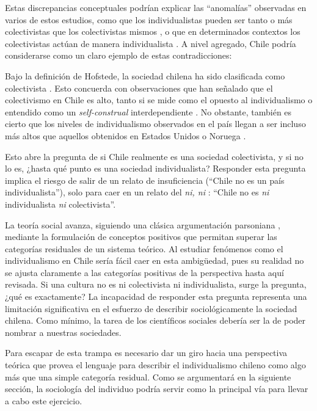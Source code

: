 \documentclass[12pt,twoside]{templates/facsothesis}
\begin{document}
Estas discrepancias conceptuales podrían explicar las ``anomalías'' observadas en varios de estos estudios, como que los individualistas pueden ser tanto o más colectivistas que los colectivistas mismos \citep{oyserman2002}, o que en determinados contextos los colectivistas actúan de manera individualista \citep{voronov2002}. A nivel agregado, Chile podría considerarse como un claro ejemplo de estas contradicciones:

Bajo la definición de Hofstede, la sociedad chilena ha sido clasificada como colectivista \citep{rojas2008}. Esto concuerda con observaciones que han señalado que el colectivismo en Chile es alto, tanto si se mide como el opuesto al individualismo \citep{oyserman2002} o entendido como un \emph{self-construal} interdependiente \citep{benavides2020}. No obstante, también es cierto que los niveles de individualismo observados en el país llegan a ser incluso más altos que aquellos obtenidos en Estados Unidos \citep{oyserman2002} o Noruega \citep{kolstad2009}.

Esto abre la pregunta de si Chile realmente es una sociedad colectivista, y si no lo es, ¿hasta qué punto es una sociedad individualista? Responder esta pregunta implica el riesgo de salir de un relato de insuficiencia (``Chile no es un país individualista''), solo para caer en un relato del \emph{ni, ni} \citep{martuccelli2010}: ``Chile no es \emph{ni} individualista \emph{ni} colectivista''.

La teoría social avanza, siguiendo una clásica argumentación parsoniana \citep{bouzanis2019}, mediante la formulación de conceptos positivos que permitan superar las categorías residuales de un sistema teórico. Al estudiar fenómenos como el individualismo en Chile sería fácil caer en esta ambigüedad, pues su realidad no se ajusta claramente a las categorías positivas de la perspectiva hasta aquí revisada. Si una cultura no es ni colectivista ni individualista, surge la pregunta, ¿qué es exactamente? La incapacidad de responder esta pregunta representa una limitación significativa en el esfuerzo de describir sociológicamente la sociedad chilena. Como mínimo, la tarea de los científicos sociales debería ser la de poder nombrar a nuestras sociedades.

Para escapar de esta trampa es necesario dar un giro hacia una perspectiva teórica que provea el lenguaje para describir el individualismo chileno como algo más que una simple categoría residual. Como se argumentará en la siguiente sección, la sociología del individuo podría servir como la principal vía para llevar a cabo este ejercicio.
\end{document}
